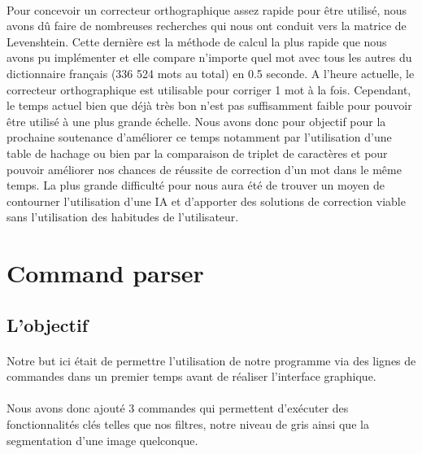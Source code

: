 \documentclass{article}
\begin{document}
\paragraph{}Pour concevoir un correcteur orthographique assez rapide pour être utilisé, nous avons dû faire de nombreuses recherches qui nous ont conduit vers la matrice de Levenshtein. Cette dernière est la méthode de calcul la plus rapide que nous avons pu implémenter et elle compare n’importe quel mot avec tous les autres du dictionnaire français (336 524 mots au total) en 0.5 seconde. A l'heure actuelle, le correcteur orthographique est utilisable pour corriger 1 mot à la fois. Cependant, le temps actuel bien que déjà très bon n’est pas suffisamment faible pour pouvoir être utilisé à une plus grande échelle. Nous avons donc pour objectif pour la prochaine soutenance d’améliorer ce temps notamment par l’utilisation d’une table de hachage ou bien par la comparaison de triplet de caractères et pour pouvoir améliorer nos chances de réussite de correction d’un mot dans le même temps. La plus grande difficulté pour nous aura été de trouver un moyen de contourner l'utilisation d'une IA et d’apporter des solutions de correction viable sans l’utilisation des habitudes de l’utilisateur.


\newpage
{}
\section{Command parser}

\subsection{L'objectif}

\paragraph{}Notre but ici était de permettre l'utilisation de notre programme via des lignes de commandes dans un premier temps avant de réaliser l'interface graphique.

\paragraph{}Nous avons donc ajouté 3 commandes qui permettent d'exécuter des fonctionnalités clés telles que nos filtres, notre niveau de gris ainsi que la segmentation d'une image quelconque.
\end{document}
